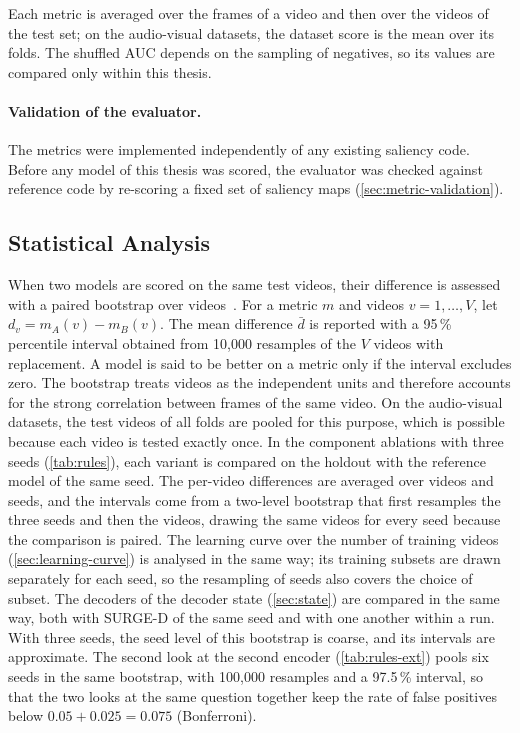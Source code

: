 Each metric is averaged over the frames of a video and then over the videos
of the test set; on the audio-visual datasets, the dataset score is the mean
over its folds. The shuffled \acrshort{AUC} depends on the sampling of negatives, so its
values are compared only within this thesis.

\paragraph{Validation of the evaluator.} The metrics were implemented
independently of any existing saliency code. Before any model of this thesis
was scored, the evaluator was checked against reference code by re-scoring a
fixed set of saliency maps (\cref{sec:metric-validation}).

\subsection{Statistical Analysis}\label{sec:statistics}

When two models are scored on the same test videos, their difference is
assessed with a paired bootstrap over videos~\cite{efron1979bootstrap}. For a
metric $m$ and videos $v=1,\dots,V$, let $d_v=m_A(v)-m_B(v)$. The mean
difference $\bar d$ is reported with a 95\,\% percentile interval obtained
from 10,000 resamples of the $V$ videos with replacement. A model is said to
be better on a metric only if the interval excludes zero. The bootstrap
treats videos as the independent units and therefore accounts for the strong
correlation between frames of the same video. On the audio-visual datasets,
the test videos of all folds are pooled for this purpose, which is possible
because each video is tested exactly once. In the component ablations with
three seeds (\cref{tab:rules}), each variant is compared on the holdout with the
reference model of the same seed. The per-video differences are averaged over
videos and seeds, and the intervals come from a two-level bootstrap that first
resamples the three seeds and then the videos, drawing the same videos for
every seed because the comparison is paired. The learning curve over the number
of training videos (\cref{sec:learning-curve}) is analysed in the same way;
its training subsets are drawn separately for each seed, so the resampling of
seeds also covers the choice of subset. The decoders of the decoder state
(\cref{sec:state}) are compared in the same way, both with SURGE-D of the same
seed and with one another within a run. With three seeds, the
seed level of this bootstrap is coarse, and its intervals are approximate.
The second look at the second encoder (\cref{tab:rules-ext}) pools six seeds in the
same bootstrap, with 100,000 resamples and a 97.5\,\% interval, so that the two
looks at the same question together keep the rate of false positives below
$0.05+0.025=0.075$ (Bonferroni).

